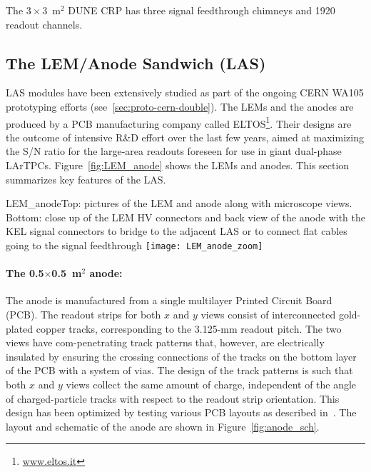 The $3\times3$~m$^2$ DUNE CRP %
has three signal feedthrough chimneys and 1920 readout channels.

\subsection{The LEM/Anode Sandwich (LAS)}

LAS modules have been extensively studied as part of the ongoing CERN WA105
prototyping efforts (see~\ref{sec:proto-cern-double}). The LEMs and the anodes are produced by a PCB 
manufacturing company called ELTOS\footnote{\url{www.eltos.it}}. Their designs are the
outcome of intensive R\&D effort over the last few years, aimed at maximizing the S/N ratio %
for the large-area readouts foreseen for use in 
giant dual-phase LArTPCs.  Figure~\ref{fig:LEM_anode} shows the LEMs and anodes. %
This section summarizes key features of the LAS.

\begin{cdrfigure}
{LEM_anode}{Top: pictures of the LEM and anode along with microscope
  views. Bottom: close up of the LEM HV connectors and back view of the anode 
with the KEL signal connectors to bridge to the adjacent LAS or to connect 
flat cables going to the signal feedthrough}
 \texttt{[image: LEM\_anode\_zoom]}  
 \end{cdrfigure}


 \paragraph{The 0.5$\times$0.5~m$^2$ anode:}
The anode is manufactured from a single multilayer Printed Circuit
Board (PCB). The readout strips for both $x$ and $y$ views  consist of
interconnected gold-plated copper tracks, corresponding %
to the 3.125-mm readout pitch. The two views have
com-penetrating  track patterns that, however, are electrically
insulated by ensuring the crossing connections of the tracks on the
bottom layer of the PCB with a system of vias.  
The design of the track
patterns is such that both $x$ and $y$ views collect the same amount
of charge, independent of the angle of charged-particle tracks with
respect to the readout strip orientation. This design has been
optimized by testing various PCB layouts %
as described in~\cite{Cantini:2013yba}.  The layout and
schematic of the anode are shown in Figure~\ref{fig:anode_sch}.

